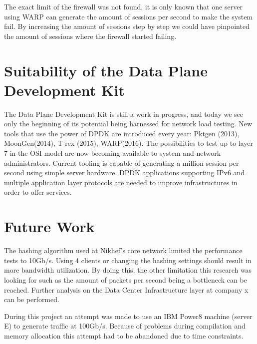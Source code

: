 The exact limit of the firewall was not found, it is only known that one server using WARP can generate the amount of sessions per second to make the system fail.
By increasing the amount of sessions step by step we could have pinpointed the amount of sessions where the firewall started failing.


\section{Suitability of the Data Plane Development Kit}
The Data Plane Development Kit is still a work in progress, and today we see only the beginning of its potential being harnessed for network load testing. New tools that use the power of DPDK are introduced every year:
Pktgen (2013), MoonGen(2014), T-rex (2015), WARP(2016).
The possibilities to test up to layer 7 in the OSI model are now becoming available to system and network administrators. 
Current tooling is capable of generating a million session per second using simple server hardware. 
DPDK applications supporting IPv6 and multiple application layer protocols are needed to improve infrastructures in order to offer services. 

\section{Future Work}
The hashing algorithm used at Nikhef's core network limited the performance tests to 10Gb/s. Using 4 clients or changing the hashing settings should result in more bandwidth utilization. 
By doing this, the other limitation this research was looking for such as the amount of packets per second being a bottleneck can be reached. Further analysis on the Data Center Infrastructure layer at company x can be performed. 

During this project an attempt was  made to use an IBM Power8 machine (server E) to generate traffic at 100Gb/s. Because of problems during compilation and memory allocation this attempt had to be abandoned due to time constraints.

